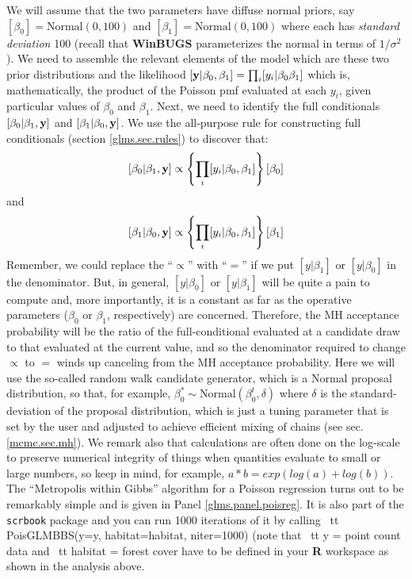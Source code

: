 We will assume that the two parameters have diffuse
normal priors, say $[\beta_0] = \mbox{Normal}(0,100)$ and
$[\beta_1]=\mbox{Normal}(0,100)$ where each has {\it standard deviation}
100 (recall that {\bf WinBUGS} parameterizes the normal in terms of $1/\sigma^{2}$).
We need to assemble the relevant elements of the model which are these
two prior distributions and the
likelihood $[{\bf y}|\beta_0,\beta_1] = \prod_{i} [y_i|\beta_0 \beta_1] $ which is,
mathematically, the product of the Poisson pmf evaluated at each $y_i$,
given particular values of $\beta_0$ and $\beta_1$.
Next, we need to identify the full conditionals
$[\beta_0|\beta_1, {\bf y}]$ and $[\beta_1|\beta_0,{\bf y}]$.  We use the all-purpose
rule for constructing full conditionals
(section \ref{glms.sec.rules})
 to discover that:
\[
 [\beta_0|\beta_1,{\bf y}] \propto \left\{ \prod_{i} [y_{i}|\beta_0,\beta_1]\right\}[\beta_0]
\]
and
\[
 [\beta_1|\beta_0,{\bf y}] \propto \left\{ \prod_{i}
   [y_{i}|\beta_0,\beta_1]\right\} [\beta_1]
\]
Remember, we could replace the ``$\propto$'' with ``$=$'' if we
put $[y|\beta_1]$ or $[y|\beta_0]$ in the denominator. But, in general,
$[y|\beta_0]$ or $[y|\beta_1]$ will be quite a pain to compute and, more
importantly, it is a constant as far as the operative parameters
($\beta_0$ or $\beta_1$,
respectively) are concerned. Therefore,
the MH acceptance probability will be the ratio of the
full-conditional evaluated at a candidate draw to that evaluated at the
current value, and so the denominator required to change $\propto$ to $=$
winds up canceling from the MH acceptance probability.
Here we will
use the so-called random walk candidate generator, which is a Normal proposal distribution, so that, for example,
 $\beta_0^{*} \sim \mbox{Normal}(\beta_0^{t},\delta)$ where $\delta$ is
 the standard-deviation of the proposal distribution, which is just a
 tuning parameter that is set by the user and adjusted to achieve
 efficient mixing of chains (see sec. \ref{mcmc.sec.mh}).
We remark also that calculations are often done on the log-scale to
preserve numerical integrity of things when quantities evaluate to
small or large numbers, so keep in mind, for example,
$a*b = exp(log(a) + log(b))$.
 The ``Metropolis within
Gibbs'' algorithm for a Poisson regression turns out to be remarkably simple and is given in Panel \ref{glms.panel.poisreg}. It is also part of the {\tt scrbook} package and you can run 1000 iterations of it by calling {\ tt PoisGLMBBS(y=y, habitat=habitat, niter=1000)} (note that {\ tt y} = point count data and {\ tt habitat} = forest cover have to be defined in your {\bf R} workspace as shown in  the {\BUGS} analysis above. 

